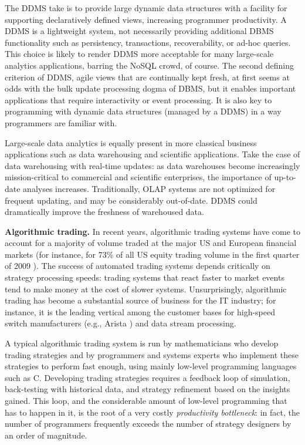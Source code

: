 %

The DDMS take is to provide large dynamic data structures with a facility for
supporting declaratively defined views, increasing programmer productivity. A
DDMS is a lightweight system, not necessarily providing additional DBMS
functionality such as persistency, transactions, recoverability, or ad-hoc
queries. This choice is likely to render DDMS more acceptable for many
large-scale analytics applications, barring the NoSQL crowd, of course. The
second defining criterion of DDMS, agile views that are continually kept fresh,
at first seems at odds with the bulk update processing dogma of DBMS, but it
enables important applications that require interactivity or event processing.
It is also key to programming with dynamic data structures (managed by a DDMS)
in a way programmers are familiar with.


Large-scale data analytics is equally present in more classical business
applications such as data warehousing and scientific applications. Take the
case of data warehousing with real-time updates: as data warehouses become
increasingly mission-critical to commercial and scientific enterprises, the
importance of up-to-date analyses increases. Traditionally, OLAP systems are not
optimized for frequent updating, and may be considerably out-of-date. DDMS could
dramatically improve the freshness of warehoused data.


\medskip


{\bf Algorithmic trading.}\/
In recent years, algorithmic trading systems have come to account for a majority
of volume traded at the major US and European financial markets (for instance,
for 73\% of all US equity trading volume in the first quarter of 2009
\cite{Iati2009}). The success of automated trading systems depends critically on
strategy processing speeds: trading systems that react faster to market events
tend to make money at the cost of slower systems. Unsurprisingly, algorithmic
trading has become a substantial source of business for the IT industry; for
instance, it is the leading vertical among the customer bases for high-speed
switch manufacturers (e.g., Arista \cite{Becht2010}) and data stream processing.




A typical algorithmic trading system is run by mathematicians who develop
trading strategies and by programmers and systems experts who implement these
strategies to perform fast enough, using mainly low-level programming languages
such as C. Developing trading strategies requires a feedback loop of simulation,
back-testing with historical data, and strategy refinement based on the insights
gained. This loop, and the considerable amount of low-level programming that has
to happen in it, is the root of a very costly {\em productivity bottleneck}\/:
in fact, the number of programmers frequently exceeds the number of strategy
designers by an order of magnitude.

